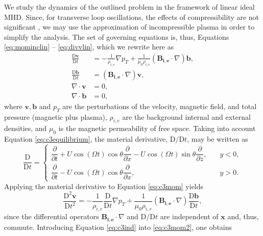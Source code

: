 \documentclass[12pt]{ociamthesis}
\begin{document}
We study the dynamics of the outlined problem in the framework of linear ideal MHD.
Since, for transverse loop oscillations, the effects of compressibility are not significant \citep{Ruderman2009}, we may use the approximation of incompressible plasma in order to simplify the analysis.
The set of governing equations is, thus, Equations \eqref{eq:mominclin} -- \eqref{eq:divvlin}, which we rewrite here as
% 
\begin{align}
\label{eq:c3mom}
\frac{\mathrm{D} \mathbf{v}}{\mathrm{D} t}
& = - \frac{1}{\rho_{i, e}} \nabla p_T
+ \frac{1}{\mu_0 \rho_{i, e}}( \mathbf{B_{i, e}} \cdot \nabla )\mathbf{b},
\\
\label{eq:c3ind}
\frac{\mathrm{D} \mathbf{b}}{\mathrm{D} t}
& = ( \mathbf{B_{i, e}} \cdot \nabla ) \mathbf{v},
\\
\nabla \cdot \mathbf{v} & = 0,
\\
\nabla \cdot \mathbf{b} & = 0,
\end{align}
%
where $\mathbf v, \mathbf b$ and $p_T$ are the perturbations of the velocity, magnetic field, and total pressure (magnetic plus plasma), $\rho_{i,e}$ are the background internal and external densities, and $\mu_0$ is the magnetic permeability of free space.
Taking into account Equation \eqref{eq:c3equilibrium}, the material derivative, $\mathrm{D}/\mathrm{D} t$, may be written as
%
\begin{equation}
\dfrac{\mathrm{D}}{\mathrm{D} t}
= \begin{cases}
\dfrac{\partial}{\partial t}
+ U \cos(\Omega t) \cos \theta \dfrac{\partial}{\partial x}
- U \cos(\Omega t) \sin \theta \dfrac{\partial}{\partial z}, & \quad y < 0,
\\[0.3cm]
\dfrac{\partial}{\partial t}
- U \cos(\Omega t) \cos \theta \dfrac{\partial}{\partial x}, & \quad y > 0.
\end{cases}
\end{equation}
%
Applying the material derivative to Equation \eqref{eq:c3mom} yields
%
\begin{equation}
\label{eq:c3mom2}
\frac{\mathrm{D}^2 \mathbf{v}}{\mathrm{D} t^2}
= - \frac{1}{\rho_{i, e}} \frac{\mathrm{D}}{\mathrm{D} t} \nabla p_T
+ \frac{1}{\mu_0 \rho_{i, e}}( \mathbf{B_{i, e}} \cdot \nabla) \frac{\mathrm{D} \mathbf{b}}{\mathrm{D} t},
\end{equation}
%
since the differential operators $\mathbf{B_{i, e}} \cdot \nabla$ and $\mathrm{D}/\mathrm{D} t$ are independent of $\mathbf x$ and, thus, commute.
Introducing Equation \eqref{eq:c3ind} into \eqref{eq:c3mom2}, one obtains
\end{document}

